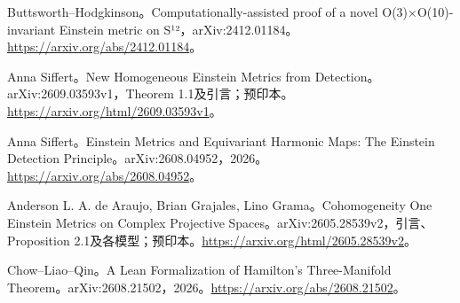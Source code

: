 \documentclass[11pt,a4paper]{article}
\theoremstyle{definition}
\begin{document}
\begin{enumerate}[label={[\arabic*]},leftmargin=2.2em,itemsep=0.55em]
\item Buttsworth--Hodgkinson。Computationally-assisted proof of a novel O(3)×O(10)-invariant Einstein metric on S¹²，arXiv:2412.01184。\url{https://arxiv.org/abs/2412.01184}。
\item Anna Siffert。New Homogeneous Einstein Metrics from Detection。arXiv:2609.03593v1，Theorem 1.1及引言；预印本。\url{https://arxiv.org/html/2609.03593v1}。
\item Anna Siffert。Einstein Metrics and Equivariant Harmonic Maps: The Einstein Detection Principle。arXiv:2608.04952，2026。\url{https://arxiv.org/abs/2608.04952}。
\item Anderson L. A. de Araujo, Brian Grajales, Lino Grama。Cohomogeneity One Einstein Metrics on Complex Projective Spaces。arXiv:2605.28539v2，引言、Proposition 2.1及各模型；预印本。\url{https://arxiv.org/html/2605.28539v2}。
\item Chow--Liao--Qin。A Lean Formalization of Hamilton's Three-Manifold Theorem。arXiv:2608.21502，2026。\url{https://arxiv.org/abs/2608.21502}。
\end{enumerate}
\end{document}
